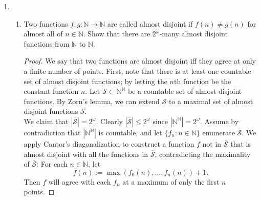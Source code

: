 \documentclass{article}
\begin{document}
\begin{enumerate}[label={\bf Q\arabic*:}]
\begin{proof}
      Consider the element $y-a\in\mathbb{S}$ and its multiplicative
      inverse $(y-a)^{-1}\in\mathbb{S}$. Since $a\in R_1$, we have $y-a>0$.
      Then the multiplicative inverse $(y-a)^{-1}$ must also be greater
      than 0, because $\mathcal{R}$ and thus $\mathcal{S}$ satisfies the
      sentence which says that the multiplicative inverse of a positive
      element is also positive. Then from assumption, $0\leq(y-a)^{-1}\leq
      N$ for some $N\in\mathbb{N}^+$. At the same time, since $a\not\in
      R_2$, we have $0<y-a<1/N$. Multiplying these two inequalities give us
      $1=(y-a)^{-1}\cdot(y-a)<N\cdot 1/N=1$, a contradiction. Note that we
      can multiply these inequalities because $\mathcal{R}$ and thus
      $\mathcal{S}$ satisfies the sentence that says if $0\leq a_1\leq a_2$
      and $0<b_1<b_2$ then $a_1\cdot b_1\leq a_2\cdot b_2$.
    \end{proof}

  \item
    \begin{enumerate}
      \item Two functions $f,g:\mathbb{N}\rightarrow\mathbb{N}$ are called
        almost disjoint if $f(n)\neq g(n)$ for almost all of
        $n\in\mathbb{N}$. Show that there are $2^\omega$-many almost
        disjoint functions from $\mathbb{N}$ to $\mathbb{N}$.

        \begin{proof}
          We say that two functions are almost disjoint iff they agree at
          only a finite number of points. First, note that there is at
          least one countable set of almost disjoint functions; by letting
          the $n$th function be the constant function $n$. Let
          $\mathcal{S}\subset\mathbb{N}^{\mathbb{N}}$ be a countable set of
          almost disjoint functions. By Zorn's lemma, we can extend
          $\mathcal{S}$ to a maximal set of almost disjoint functions
          $\overline{\mathcal{S}}$. \\

          We claim that $|\overline{\mathcal{S}}|=2^{\omega}$. Clearly
          $|\overline{\mathcal{S}}|\leq2^{\omega}$ since
          $|\mathbb{N}^{\mathbb{N}}|=2^{\omega}$. Assume by contradiction
          that $|\mathbb{N}^{\mathbb{N}}|$ is countable, and let
          $\{f_n:n\in\mathbb{N}\}$ enumerate $\overline{\mathcal{S}}$. We
          apply Cantor's diagonalization to construct a function $f$ not in
          $\overline{\mathcal{S}}$ that is almost disjoint with all the
          functions in $\overline{\mathcal{S}}$, contradicting the
          maximality of $\overline{\mathcal{S}}$: For each
          $n\in\mathbb{N}$, let
          \begin{equation*}
            f(n) := \max(f_0(n),\ldots,f_n(n))+1.
          \end{equation*}
          Then $f$ will agree with each $f_n$ at a maximum of only the
          first $n$ points.
        \end{proof}


\end{enumerate}
\end{enumerate}
\end{document}
